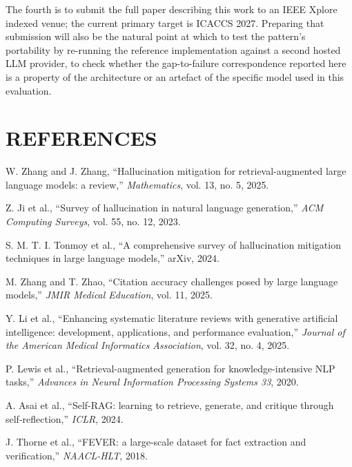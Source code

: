 \documentclass[12pt,a4paper]{report}
\begin{document}
The fourth is to submit the full paper describing this work to an IEEE Xplore
indexed venue; the current primary target is ICACCS 2027. Preparing that
submission will also be the natural point at which to test the pattern's
portability by re-running the reference implementation against a second
hosted LLM provider, to check whether the gap-to-failure correspondence
reported here is a property of the architecture or an artefact of the
specific model used in this evaluation.

\chapter*{REFERENCES}
\thispagestyle{plain}
\begin{enumerate}[label={[\arabic*]},leftmargin=2.2em]
  \item \label{ref:zhang2025hallucination} W. Zhang and J. Zhang, ``Hallucination mitigation for retrieval-augmented large language models: a review,'' \emph{Mathematics}, vol. 13, no. 5, 2025.
  \item \label{ref:ji2023survey} Z. Ji et al., ``Survey of hallucination in natural language generation,'' \emph{ACM Computing Surveys}, vol. 55, no. 12, 2023.
  \item \label{ref:tonmoy2024comprehensive} S. M. T. I. Tonmoy et al., ``A comprehensive survey of hallucination mitigation techniques in large language models,'' arXiv, 2024.
  \item \label{ref:zhang2025citation} M. Zhang and T. Zhao, ``Citation accuracy challenges posed by large language models,'' \emph{JMIR Medical Education}, vol. 11, 2025.
  \item \label{ref:li2025enhancing} Y. Li et al., ``Enhancing systematic literature reviews with generative artificial intelligence: development, applications, and performance evaluation,'' \emph{Journal of the American Medical Informatics Association}, vol. 32, no. 4, 2025.
  \item \label{ref:lewis2020retrieval} P. Lewis et al., ``Retrieval-augmented generation for knowledge-intensive NLP tasks,'' \emph{Advances in Neural Information Processing Systems 33}, 2020.
  \item \label{ref:asai2024selfrag} A. Asai et al., ``Self-RAG: learning to retrieve, generate, and critique through self-reflection,'' \emph{ICLR}, 2024.
  \item \label{ref:thorne2018fever} J. Thorne et al., ``FEVER: a large-scale dataset for fact extraction and verification,'' \emph{NAACL-HLT}, 2018.

\end{enumerate}
\end{document}
